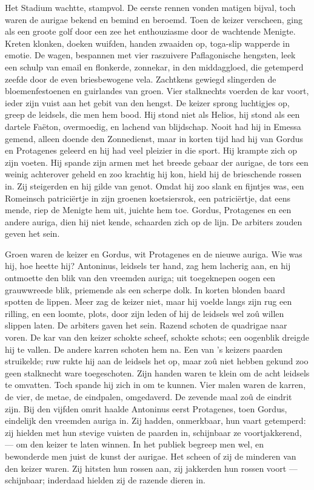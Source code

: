 \documentclass[a4paper, 12pt, oneside, dutch]{article}
\begin{document}
Het Stadium wachtte, stampvol. De eerste rennen vonden matigen bijval, toch waren de aurigae bekend en bemind en beroemd. Toen de keizer verscheen, ging als een groote golf door een zee het enthouziasme door de wachtende Menigte. Kreten klonken, doeken wuifden, handen zwaaiden op, toga-slip wapperde in emotie. De wagen, bespannen met vier raszuivere Paflagonische hengsten, leek een schulp van email en flonkerde, zonnekar, in den middaggloed, die getemperd zeefde door de even briesbewogene vela. Zachtkens gewiegd slingerden de bloemenfestoenen en guirlandes van groen. Vier stalknechts voerden de kar voort, ieder zijn vuist aan het gebit van den hengst. De keizer sprong luchtigjes op, greep de leidsels, die men hem bood. Hij stond niet als Helios, hij stond als een dartele Faëton, overmoedig, en lachend van blijdschap. Nooit had hij in Emessa gemend, alleen doende den Zonnedienst, maar in korten tijd had hij van Gordus en Protagenes geleerd en hij had veel pleizier in die sport. Hij krampte zich op zijn voeten. Hij spande zijn armen met het breede gebaar der aurigae, de tors een weinig achterover geheld en zoo krachtig hij kon, hield hij de brieschende rossen in. Zij steigerden en hij gilde van genot. Omdat hij zoo slank en fijntjes was, een Romeinsch patriciërtje in zijn groenen koetsiersrok, een patriciërtje, dat eens mende, riep de Menigte hem uit, juichte hem toe. Gordus, Protagenes en een andere auriga, dien hij niet kende, schaarden zich op de lijn. De arbiters zouden geven het sein.

Groen waren de keizer en Gordus, wit Protagenes en de nieuwe auriga. Wie was hij, hoe heette hij? Antoninus, leidsels ter hand, zag hem lacherig aan, en hij ontmoette den blik van den vreemden auriga; uit toegeknepen oogen een grauwwreede blik, priemende als een scherpe dolk. In korten blonden baard spotten de lippen. Meer zag de keizer niet, maar hij voelde langs zijn rug een rilling, en een loomte, plots, door zijn leden of hij de leidsels wel zoû willen slippen laten. De arbiters gaven het sein. Razend schoten de quadrigae naar voren. De kar van den keizer schokte scheef, schokte schots; een oogenblik dreigde hij te vallen. De andere karren schoten hem na. Een van 's keizers paarden struikelde; ruw rukte hij aan de leidsels het op, maar zoû niet hebben gekund zoo geen stalknecht ware toegeschoten. Zijn handen waren te klein om de acht leidsels te omvatten. Toch spande hij zich in om te kunnen. Vier malen waren de karren, de vier, de metae, de eindpalen, omgedaverd. De zevende maal zoû de eindrit zijn. Bij den vijfden omrit haalde Antoninus eerst Protagenes, toen Gordus, eindelijk den vreemden auriga in. Zij hadden, onmerkbaar, hun vaart getemperd: zij hielden met hun stevige vuisten de paarden in, schijnbaar ze voortjakkerend, --- om den keizer te laten winnen. In het publiek begreep men wel, en bewonderde men juist de kunst der aurigae. Het scheen of zij de minderen van den keizer waren. Zij hitsten hun rossen aan, zij jakkerden hun rossen voort --- schijnbaar; inderdaad hielden zij de razende dieren in.
\end{document}
